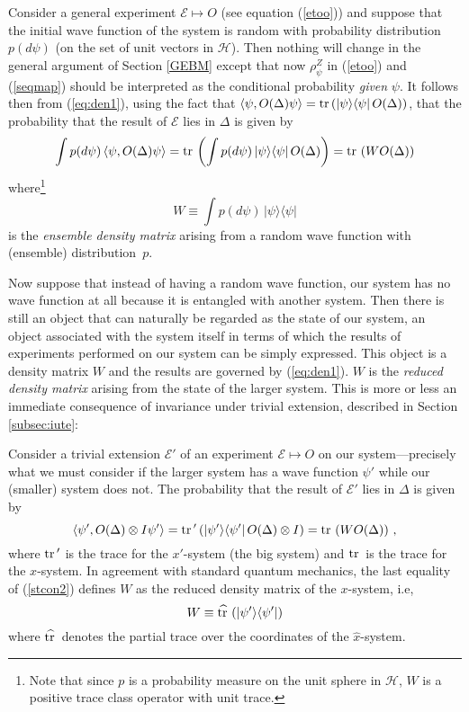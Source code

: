 \documentclass[12pt]{article}
\newcommand{\eq}[1]{(\ref{#1})}
\newcommand{\wf}{wave function}
\newcommand{\tr}{\mbox{${\rm tr}\,$}}
\renewcommand{\H}{\mbox{$\mathcal{H}$}}
\newcommand{\E}{\mbox{$\mathscr{E}$}}
\begin{document}
Consider a general experiment $\E\mapsto O$ (see equation \eq{etoo})
and suppose that the initial \wf{} of the system is random with
probability distribution $p (d\psi)$ (on the set of unit vectors in
\H).  Then nothing will change in the general argument of Section
\ref{GEBM} except that now $\rho^Z_\psi$ in \eq{etoo} and \eq{seqmap}
should be interpreted as the conditional probability {\it given}
$\psi$.  It follows then {}from (\ref{eq:den1}), using the fact that
$\langle \psi , O (\Delta) \psi \rangle = \tr (|\psi \rangle \langle
\psi| \, O(\Delta) ) $, that the probability that the result of \E{}
lies in $\Delta$ is given by
\begin{equation}
\label{stcon} \int p(d \psi )\,\langle \psi , O
(\Delta) \psi \rangle = \tr\left( \int p(d\psi )\,| \psi \rangle
\langle \psi| \, O(\Delta)\right)= \tr\left( W
O(\Delta)\right)
\end{equation}
where\footnote{Note that since $p$ is a probability measure on the
   unit sphere in $\H$, $W$ is a positive trace class operator with
   unit trace.}
   \begin{equation}
W\equiv \int p(d\psi )\,| \psi \rangle \langle \psi |
\label{eq:ensdm}
   \end{equation}
   is the \emph{ensemble density matrix} arising {}from a random wave
   function with (ensemble) distribution~$p$.


   Now suppose that instead of having a random \wf{}, our system has no
   \wf{} at all because it is entangled with another system.  Then
   there is still an object that can naturally be regarded as the state
   of our system, an object associated with the system itself in terms
   of which the results of experiments performed on our system can be
   simply expressed. This object is a density matrix $W$ and the
   results are governed by \eq{eq:den1}. $W$ is the \emph{reduced
     density matrix} arising {}from the state of the larger system.
   This is more or less an immediate consequence of invariance under
   trivial extension, described in Section \ref{subsec:iute}:

   Consider a trivial extension $\E'$ of an experiment $\E\mapsto O$ on
   our system---precisely what we must consider if the larger system
   has a \wf{} $\psi'$ while our (smaller) system does not. The
   probability that the result of $\E'$ lies in $\Delta$ is given by
\begin{equation}
\label{stcon2}
\langle \psi' , O(\Delta)\otimes I \psi' \rangle = \tr ' \left( |
\psi' \rangle \langle \psi'| \, O(\Delta)\otimes I\right)=
\tr\left( W O(\Delta)\right) \, ,
\end{equation}
where $\tr'$ is the trace for the $x'$-system (the big system) and
$\tr$ is the trace for the $x$-system.  In agreement with standard
quantum mechanics, the last equality of (\ref{stcon2}) defines $W$ as
the reduced density matrix of the $x$-system, i.e,
\begin{equation}
W\equiv \widehat{\tr}\left( | \psi' \rangle \langle \psi' |\right)
\label{eq:reddm}
\end{equation}
where $\widehat{\tr}$ denotes the partial trace over the coordinates
of the $\hat{x}$-system.
\end{document}
